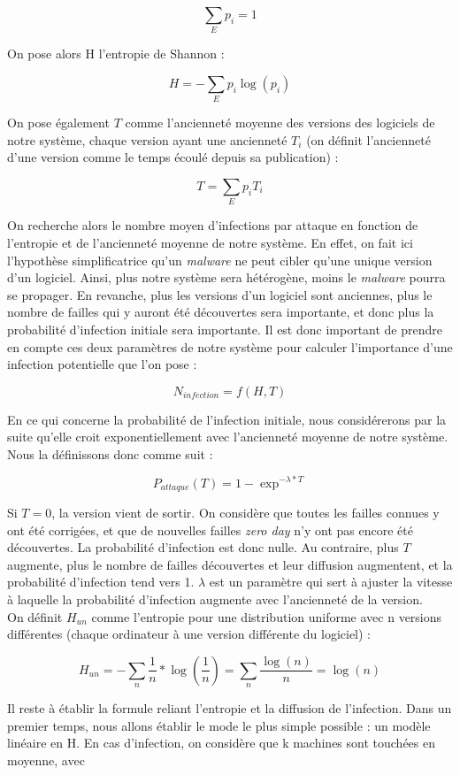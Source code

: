 \[
\sum_{E}p_i=1
\]

On pose alors H l'entropie de Shannon :

\[
H=-\sum_E p_i \log(p_i)
\]

On pose également $T$ comme l'ancienneté moyenne des versions des logiciels de notre système, chaque version ayant une ancienneté $T_i$ (on définit l'ancienneté d'une version comme le temps écoulé depuis sa publication)  :

\[
T=\sum_E p_i T_i
\]

On recherche alors le nombre moyen d'infections par attaque en fonction de l'entropie et de l'ancienneté moyenne de notre système. En effet, on fait ici l'hypothèse simplificatrice qu'un \textit{malware} ne peut cibler qu'une unique version d'un logiciel. Ainsi, plus notre système sera hétérogène, moins le \textit{malware} pourra se propager. En revanche, plus les versions d'un logiciel sont anciennes, plus le nombre de failles qui y auront été découvertes sera importante, et donc plus la probabilité d'infection initiale sera importante. Il est donc important de prendre en compte ces deux paramètres de notre système pour calculer l'importance d'une infection potentielle que l'on pose : 

\[
N_{infection} = f(H,T)
\]

En ce qui concerne la probabilité de l'infection initiale, nous considérerons par la suite qu'elle croit exponentiellement avec l'ancienneté moyenne de notre système. Nous la définissons donc comme suit :

\[
P_{attaque}(T) =1- \exp^{-\lambda*T}
\]

Si $T=0$, la version vient de sortir. On considère que toutes les failles connues y ont été corrigées, et que de nouvelles failles \textit{zero day} n'y ont pas encore été découvertes. La probabilité d'infection est donc nulle. Au contraire, plus $T$ augmente, plus le nombre de failles découvertes et leur diffusion augmentent, et la probabilité d'infection tend vers 1. $\lambda$ est un paramètre qui sert à ajuster la vitesse à laquelle la probabilité d'infection augmente avec l'ancienneté de la version.\\

On définit $H_{un}$ comme l'entropie pour une distribution uniforme avec n versions différentes (chaque ordinateur à une version différente du logiciel) :

\[
H_{un} = -\sum_n \frac{1}{n} * \log(\frac{1}{n}) = \sum_n \frac{\log(n)}{n} = \log(n)
\]

Il reste à établir la formule reliant l'entropie et la diffusion de l'infection. Dans un premier temps, nous allons établir le mode le plus simple possible : un modèle linéaire en H. En cas d'infection, on considère que k machines sont touchées en moyenne, avec 

